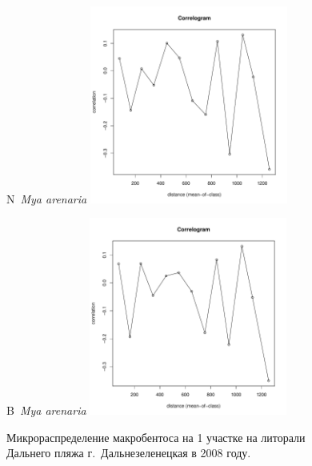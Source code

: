 \documentclass[12pt, a4paper]{disser}
\begin{document}
\begin{figure}[h]
	\begin{minipage}[b]{.46\linewidth}
	\begin{center}
	{\small N~{\it Mya arenaria}}
		\includegraphics[width=65mm]{../Barenc_Sea/distribution_Moran/Plyazh081_moran_N_Mya_arenaria_.pdf}
	\end{center}
	\end{minipage}
%
	\hfil %
%
	\begin{minipage}[b]{.46\linewidth}
	\begin{center}
	{\small B~{\it Mya arenaria}}
		\includegraphics[width=65mm]{../Barenc_Sea/distribution_Moran/Plyazh081_moran_B_Mya_arenaria_.pdf}
	\end{center}
	\end{minipage}



	\caption{Микрораспределение макробентоса на 1 участке на литорали Дальнего пляжа г.~Дальнезеленецкая в 2008 году.}
	\label{ris:moransI_Plyazh081_1}
	\end{figure}
\end{document}
